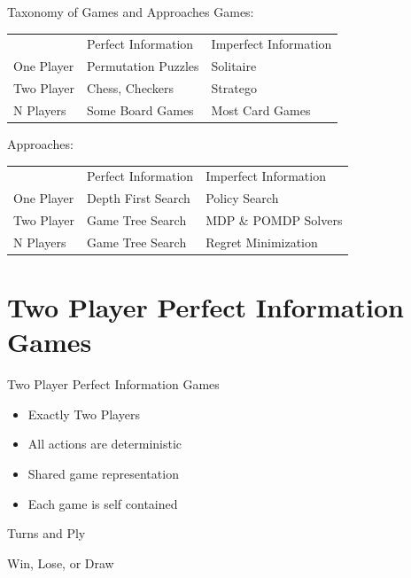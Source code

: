 \documentclass{powerdot}
\begin{document}
\begin{slide}{Taxonomy of Games and Approaches}
  Games:
  \begin{tabular}{lll}
               & Perfect Information & Imperfect Information \\
    One Player & Permutation Puzzles & Solitaire \\
    Two Player & Chess, Checkers     & Stratego \\
    N Players  & Some Board Games    & Most Card Games \\
  \end{tabular}

  Approaches:
  \begin{tabular}{lll}
               & Perfect Information & Imperfect Information \\
    One Player & Depth First Search & Policy Search \\
    Two Player & Game Tree Search   & MDP \& POMDP Solvers \\
    N Players  & Game Tree Search   & Regret Minimization \\
  \end{tabular}
\end{slide}

\section{Two Player Perfect Information Games}

\begin{slide}{Two Player Perfect Information Games}
  \begin{itemize}
    \item Exactly Two Players
    \item All actions are deterministic
    \item Shared game representation
    \item Each game is self contained
  \end{itemize}
\end{slide}

\begin{slide}{Turns and Ply}
\end{slide}

\begin{slide}{Win, Lose, or Draw}
\end{slide}
\end{document}
